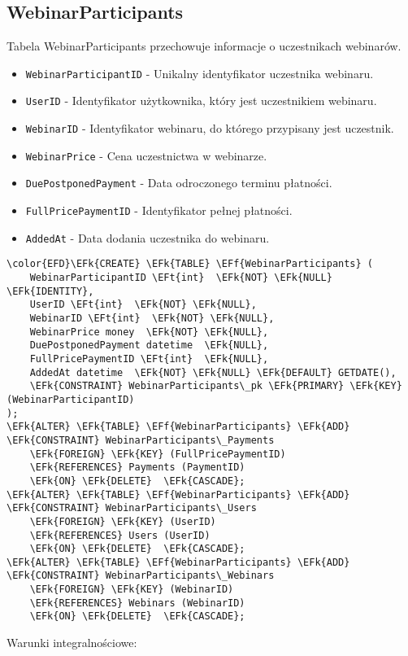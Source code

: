 \documentclass[11pt]{article}
\newcommand{\EFk}[1]{\textcolor{EFk}{\textbf{#1}}} %
\newcommand{\EFf}[1]{\textcolor{EFf}{#1}} %
\newcommand{\EFt}[1]{\textcolor{EFt}{\textbf{#1}}} %
\begin{document}
\subsection{WebinarParticipants}
\label{sec:org4bdd9b3}
Tabela WebinarParticipants przechowuje informacje o uczestnikach webinarów.
\begin{itemize}
\item \texttt{WebinarParticipantID} - Unikalny identyfikator uczestnika webinaru.
\item \texttt{UserID} - Identyfikator użytkownika, który jest uczestnikiem webinaru.
\item \texttt{WebinarID} - Identyfikator webinaru, do którego przypisany jest uczestnik.
\item \texttt{WebinarPrice} - Cena uczestnictwa w webinarze.
\item \texttt{DuePostponedPayment} - Data odroczonego terminu płatności.
\item \texttt{FullPricePaymentID} - Identyfikator pełnej płatności.
\item \texttt{AddedAt} - Data dodania uczestnika do webinaru.
\end{itemize}
\begin{Code}
\begin{Verbatim}
\color{EFD}\EFk{CREATE} \EFk{TABLE} \EFf{WebinarParticipants} (
    WebinarParticipantID \EFt{int}  \EFk{NOT} \EFk{NULL} \EFk{IDENTITY},
    UserID \EFt{int}  \EFk{NOT} \EFk{NULL},
    WebinarID \EFt{int}  \EFk{NOT} \EFk{NULL},
    WebinarPrice money  \EFk{NOT} \EFk{NULL},
    DuePostponedPayment datetime  \EFk{NULL},
    FullPricePaymentID \EFt{int}  \EFk{NULL},
    AddedAt datetime  \EFk{NOT} \EFk{NULL} \EFk{DEFAULT} GETDATE(),
    \EFk{CONSTRAINT} WebinarParticipants\_pk \EFk{PRIMARY} \EFk{KEY}  (WebinarParticipantID)
);
\EFk{ALTER} \EFk{TABLE} \EFf{WebinarParticipants} \EFk{ADD} \EFk{CONSTRAINT} WebinarParticipants\_Payments
    \EFk{FOREIGN} \EFk{KEY} (FullPricePaymentID)
    \EFk{REFERENCES} Payments (PaymentID)
    \EFk{ON} \EFk{DELETE}  \EFk{CASCADE};
\EFk{ALTER} \EFk{TABLE} \EFf{WebinarParticipants} \EFk{ADD} \EFk{CONSTRAINT} WebinarParticipants\_Users
    \EFk{FOREIGN} \EFk{KEY} (UserID)
    \EFk{REFERENCES} Users (UserID)
    \EFk{ON} \EFk{DELETE}  \EFk{CASCADE};
\EFk{ALTER} \EFk{TABLE} \EFf{WebinarParticipants} \EFk{ADD} \EFk{CONSTRAINT} WebinarParticipants\_Webinars
    \EFk{FOREIGN} \EFk{KEY} (WebinarID)
    \EFk{REFERENCES} Webinars (WebinarID)
    \EFk{ON} \EFk{DELETE}  \EFk{CASCADE};
\end{Verbatim}
\end{Code}
Warunki integralnościowe:
\end{document}
